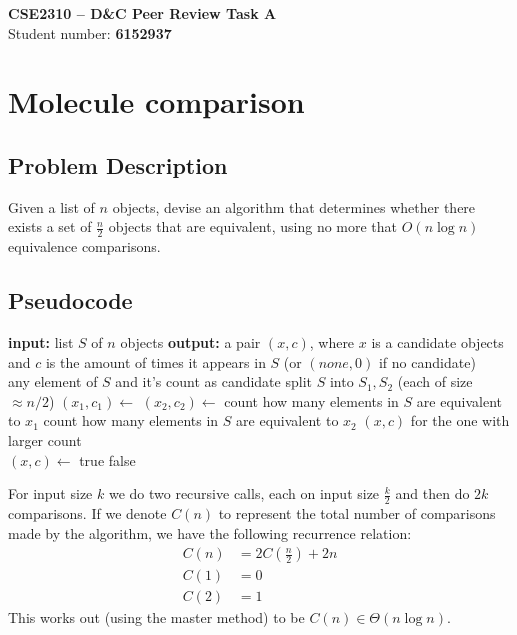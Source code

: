 \documentclass[a4paper,11pt]{article}
\begin{document}
	\begin{center}
		{\Large \textbf{CSE2310 – D\&C Peer Review Task A}}\\[4pt]
		Student number: \textbf{6152937}
	\end{center}

	\vspace{1em}

	\section{Molecule comparison}
	\subsection{Problem Description}
		Given a list of $n$ objects, devise an algorithm that determines whether there exists a set of $\frac{n}{2}$ objects that are equivalent, using no more that $O(n\log n)$ equivalence comparisons.
	\subsection{Pseudocode}
		\begin{algorithm}[H]
			\caption{Max subset}
			\begin{algorithmic}[1]
				\State \textbf{input:} list $S$ of $n$ objects
				\State \textbf{output:} a pair $(x,c)$, where $x$ is a candidate objects and $c$ is the amount of times it appears in $S$ (or $(none, 0)$ if no candidate)\\
				 \Return any element of $S$ and it's count as candidate\EndIf
				\State split $S$ into $S_1, S_2$ (each of size $\approx n/2$)
				\State $(x_1, c_1) \gets$ 
				\State $(x_2, c_2) \gets$ 
				\State count how many elements in $S$ are equivalent to $x_1$
				\State count how many elements in $S$ are equivalent to $x_2$
				\State \Return $(x,c)$ for the one with larger count
				\EndFunction\\
				\State $(x,c) \gets$ 
				 \Return true
				\Else \text{ } \Return false
				\EndIf
				\EndFunction
			\end{algorithmic}
		\end{algorithm}

		For input size $k$ we do two recursive calls, each on input size $\frac{k}{2}$ and then do $2k$ comparisons. If we denote $C(n)$ to represent the total number of comparisons made by the algorithm, we have the following recurrence relation:
		\begin{align*}
			C(n) &= 2C(\frac{n}{2}) + 2n\\
			C(1) &= 0\\
			C(2) &= 1
		\end{align*}
		This works out (using the master method) to be $C(n)\in \Theta(n\log n)$.
\end{document}
